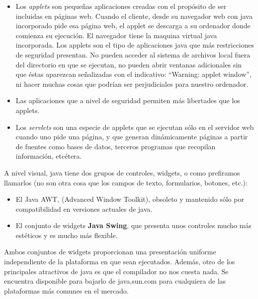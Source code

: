 \begin{itemize}

\item  Los {\em  applets}  son pequeñas  aplicaciones  creadas con  el
propósito de ser incluidas en páginas web. Cuando el cliente, desde su
navegador web con  java incorporado pide esa página web,  el applet se
descarga  a su  ordenador donde  comienza su  ejecución. El  navegador
tiene la maquina virtual java incorporada.  Los applets son el tipo de
aplicaciones  java que  más restricciones  de seguridad  presentan. No
pueden acceder  al sistema de  archivos local fuera del  directorio en
que se  ejecutan, no pueden  abrir ventanas adicionales sin  que éstas
aparezcan señalizadas  con el indicativo: ``Warning:  applet window'',
ni  hacer muchas  cosas  que podrían  ser  perjudiciales para  nuestro
ordenador.

\item  Las  aplicaciones  que  a   nivel  de  seguridad  permiten  más
libertades que los applets.

\item Los  {\em servlets} son una  especie de applets que  se ejecutan
sólo en  el servidor  web cuando  uno pide una  página, y  que generan
dinámicamente  páginas  a  partir  de fuentes  como  bases  de  datos,
terceros programas que recopilan información, etcétera.

\end{itemize}

A nivel  visual, java tiene dos  grupos de controles, widgets,  o como
prefiramos  llamarlos (no  son  otra  cosa que  los  campos de  texto,
formularios, botones, etc.):

\begin{itemize}

\item El  Java AWT,  (Advanced Window  Toolkit), obsoleto  y mantenido
sólo por compatibilidad en versiones actuales de java.

\item  El conjunto  de widgets  {\bf  Java Swing},  que presenta  unos
controles mucho más estéticos y es mucho más flexible.

\end{itemize}

Ambos  conjuntos de  widgets  proporcionan  una presentación  uniforme
independiente de la plataforma en que sean ejecutados. Además, otro de
los principales atractivos de java es  que el compilador no nos cuesta
nada.  Se  encuentra  disponible  para bajarlo  de  java.sun.com  para
cualquiera de las plataformas más comunes en el mercado.

